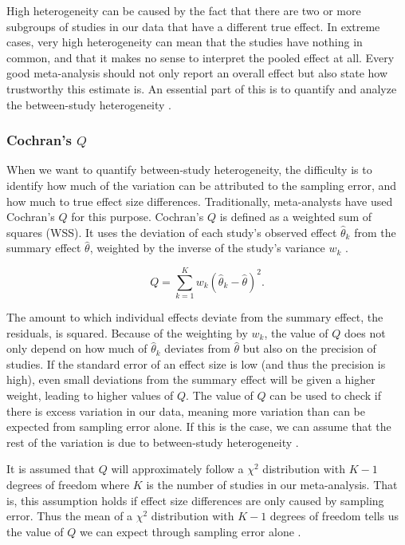 \documentclass[../../../main.tex]{subfiles}
\begin{document}
High heterogeneity can be caused by the fact that there are two or more subgroups of studies in our data that have a different true effect. In extreme cases, very high heterogeneity can mean that the studies have nothing in common, and that it makes no sense to interpret the pooled effect at all. Every good meta-analysis should not only report an overall effect but also state how trustworthy this estimate is. An essential part of this is to quantify and analyze the between-study heterogeneity \autocite{Harrer2021}.

\subsubsection{Cochran's $Q$}

When we want to quantify between-study heterogeneity, the difficulty is to identify how much of the variation can be attributed to the sampling error, and how much to true effect size differences. Traditionally, meta-analysts have used Cochran's $Q$ for this purpose. Cochran's $Q$ is defined as a weighted sum of squares (WSS). It uses the deviation of each study's observed effect $\hat{\theta}_k$ from the summary effect $\hat{\theta}$, weighted by the inverse of the study's variance $w_k$ \autocite{Harrer2021}.

\begin{equation}
Q = \sum_{k=1}^{K}w_k(\hat{\theta}_k-\hat{\theta})^2.
\end{equation}

The amount to which individual effects deviate from the summary effect, the residuals, is squared. Because of the weighting by $w_k$, the value of $Q$ does not only depend on how much of $\hat{\theta}_k$ deviates from $\hat{\theta}$ but also on the precision of studies. If the standard error of an effect size is low (and thus the precision is high), even small deviations from the summary effect will be given a higher weight, leading to higher values of $Q$. The value of $Q$ can be used to check if there is excess variation in our data, meaning more variation than can be expected from sampling error alone. If this is the case, we can assume that the rest of the variation is due to between-study heterogeneity \autocite{Harrer2021}.

It is assumed that $Q$ will approximately follow a $\chi^2$ distribution with $K-1$ degrees of freedom where $K$ is the number of studies in our meta-analysis. That is, this assumption holds if effect size differences are only caused by sampling error. Thus the mean of a $\chi^2$ distribution with $K-1$ degrees of freedom tells us the value of $Q$ we can expect through sampling error alone \autocite{Harrer2021}.
\end{document}
